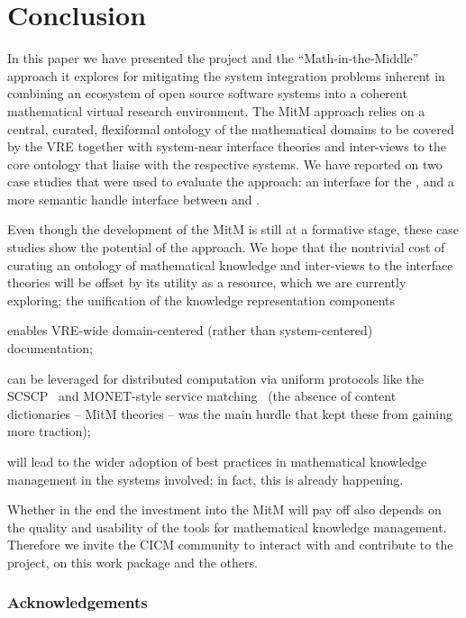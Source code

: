 \section{Conclusion}\label{sec:concl}
In this paper we have presented the \ODK project and the ``Math-in-the-Middle'' approach
it explores for mitigating the system integration problems inherent in combining an ecosystem
of open source software systems into a coherent mathematical virtual research environment.
The MitM approach relies on a central, curated, flexiformal ontology of the mathematical
domains to be covered by the VRE together with system-near interface theories and
inter-views to the core ontology that liaise with the respective systems. We have reported
on two case studies that were used to evaluate the approach: an interface for the \LMFDB,
and a more semantic handle interface between \GAP and \Sage.

Even though the development of the MitM is still at a formative stage, these case studies
show the potential of the approach. We hope that the nontrivial cost of curating an
ontology of mathematical knowledge and inter-views to the interface theories will be offset
by its utility as a resource, which we are currently exploring; the unification of the
knowledge representation components
\begin{compactitem}
\item enables VRE-wide domain-centered (rather than system-centered) documentation;
\item can be leveraged for distributed computation via uniform protocols like the
  SCSCP~\cite{HorRoz:ossp09} and MONET-style service
  matching~\cite{CaprottiEtAl:MathServiceMatching04:tr} (the absence of content
  dictionaries -- MitM theories -- was the main hurdle that kept these from gaining more
  traction);
\item will lead to the wider adoption of best practices in
  mathematical knowledge management in the systems involved; in
  fact, this is already happening.
\end{compactitem}
Whether in the end the investment into the MitM will pay off also depends on the quality
and usability of the tools for mathematical knowledge management. Therefore we invite the
CICM community to interact with and contribute to the \ODK project, on
this work package and the others.

\subsubsection*{Acknowledgements}

